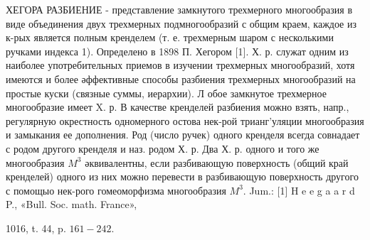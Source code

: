 \documentclass[10pt]{article}
\begin{document}
ХЕГОРА РАЗБИЕНИЕ - представление замкнутого трехмерного многообразия в виде объединения двух трехмерных подмногообразий с общим краем, каждое из к-рых является полным кренделем (т. е. трехмерным шаром с несколькими ручками индекса 1). Определено в 1898 П. Хегором [1]. Х. р. служат одним из наиболее употребительных приемов в изучении трехмерных многообразий, хотя имеются и более әффективные способы разбиения трехмерных многообразий на простые куски (связные суммы, иерархии). Л обое замкнутое трехмерное многообразие имеет X. р. В качестве кренделей разбиения можно взять, напр., регулярную окрестность одномерного остова нек-рой трианг'уляции многообразия и замыкания ее дополнения. Род (число ручек) одного кренделя всегда совнадает с родом другого кренделя и наз. родом Х. р. Два Х. р. одного и того же многообразия $M^{3}$ әквивалентны, если разбивающую поверхность (общий край кренделей) одного из них можно перевести в разбивающую поверхность другого с помощыо нек-рого гомеоморфизма многообразия $M^{3}$. Jum.: [1] H e e g a a r d P., «Bull. Soc. math. France»,

1016, t. 44, p. $161-242$.
\end{document}
